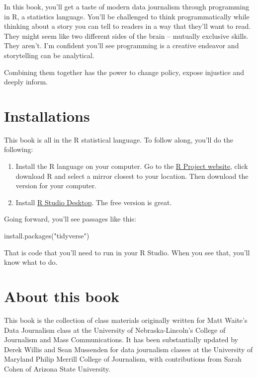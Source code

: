 \documentclass[
  letterpaper,
  DIV=11,
  numbers=noendperiod]{scrreprt}
\newenvironment{Shaded}{\begin{snugshade}}{\end{snugshade}}
\newcommand{\FunctionTok}[1]{\textcolor[rgb]{0.28,0.35,0.67}{#1}}
\newcommand{\NormalTok}[1]{\textcolor[rgb]{0.00,0.23,0.31}{#1}}
\newcommand{\StringTok}[1]{\textcolor[rgb]{0.13,0.47,0.30}{#1}}
\begin{document}
In this book, you'll get a taste of modern data journalism through
programming in R, a statistics language. You'll be challenged to think
programmatically while thinking about a story you can tell to readers in
a way that they'll want to read. They might seem like two different
sides of the brain -- mutually exclusive skills. They aren't. I'm
confident you'll see programming is a creative endeavor and storytelling
can be analytical.

Combining them together has the power to change policy, expose injustice
and deeply inform.

\hypertarget{installations}{%
\section{Installations}\label{installations}}

This book is all in the R statistical language. To follow along, you'll
do the following:

\begin{enumerate}
\def\labelenumi{\arabic{enumi}.}
\item
  Install the R language on your computer. Go to the
  \href{https://www.r-project.org/}{R Project website}, click download R
  and select a mirror closest to your location. Then download the
  version for your computer.
\item
  Install \href{https://www.rstudio.com/products/rstudio/\#Desktop}{R
  Studio Desktop}. The free version is great.
\end{enumerate}

Going forward, you'll see passages like this:

\begin{Shaded}
\begin{Highlighting}[]
\FunctionTok{install.packages}\NormalTok{(}\StringTok{"tidyverse"}\NormalTok{)}
\end{Highlighting}
\end{Shaded}

That is code that you'll need to run in your R Studio. When you see
that, you'll know what to do.

\hypertarget{about-this-book}{%
\section{About this book}\label{about-this-book}}

This book is the collection of class materials originally written for
Matt Waite's Data Journalism class at the University of
Nebraska-Lincoln's College of Journalism and Mass Communications. It has
been substantially updated by Derek Willis and Sean Mussenden for data
journalism classes at the University of Maryland Philip Merrill College
of Journalism, with contributions from Sarah Cohen of Arizona State
University.
\end{document}
